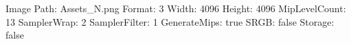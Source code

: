 Image Path: Assets\Meshes\Cerberus\Cerberus_N.png
Format: 3
Width: 4096
Height: 4096
MipLevelCount: 13
SamplerWrap: 2
SamplerFilter: 1
GenerateMips: true
SRGB: false
Storage: false